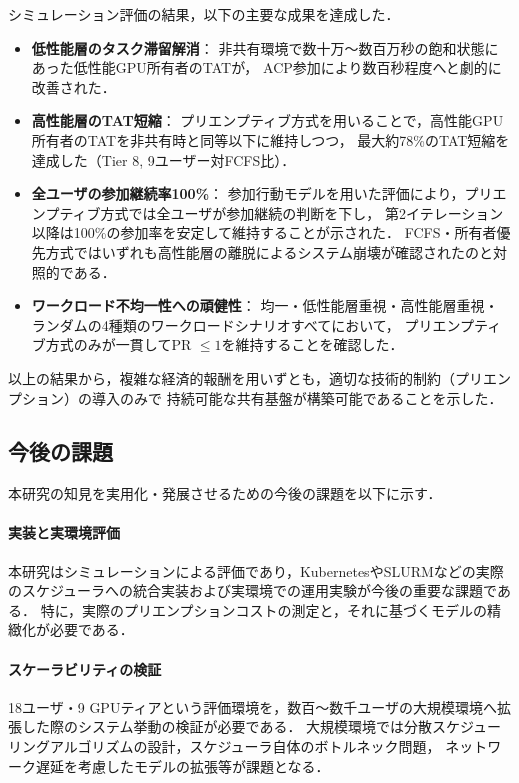 \documentclass[12pt,a4paper]{jsarticle}
\begin{document}
シミュレーション評価の結果，以下の主要な成果を達成した．

\begin{itemize}
  \item \textbf{低性能層のタスク滞留解消}：
    非共有環境で数十万〜数百万秒の飽和状態にあった低性能GPU所有者のTATが，
    ACP参加により数百秒程度へと劇的に改善された．

  \item \textbf{高性能層のTAT短縮}：
    プリエンプティブ方式を用いることで，高性能GPU所有者のTATを非共有時と同等以下に維持しつつ，
    最大約78\%のTAT短縮を達成した（Tier 8, 9ユーザー対FCFS比）．

  \item \textbf{全ユーザの参加継続率100\%}：
    参加行動モデルを用いた評価により，プリエンプティブ方式では全ユーザが参加継続の判断を下し，
    第2イテレーション以降は100\%の参加率を安定して維持することが示された．
    FCFS・所有者優先方式ではいずれも高性能層の離脱によるシステム崩壊が確認されたのと対照的である．

  \item \textbf{ワークロード不均一性への頑健性}：
    均一・低性能層重視・高性能層重視・ランダムの4種類のワークロードシナリオすべてにおいて，
    プリエンプティブ方式のみが一貫してPR $\leq 1$を維持することを確認した．
\end{itemize}

以上の結果から，複雑な経済的報酬を用いずとも，適切な技術的制約（プリエンプション）の導入のみで
持続可能な共有基盤が構築可能であることを示した．

\subsection{今後の課題}

本研究の知見を実用化・発展させるための今後の課題を以下に示す．

\paragraph{実装と実環境評価}
本研究はシミュレーションによる評価であり，KubernetesやSLURMなどの実際のスケジューラへの統合実装および実環境での運用実験が今後の重要な課題である．
特に，実際のプリエンプションコストの測定と，それに基づくモデルの精緻化が必要である．

\paragraph{スケーラビリティの検証}
18ユーザ・9 GPUティアという評価環境を，数百〜数千ユーザの大規模環境へ拡張した際のシステム挙動の検証が必要である．
大規模環境では分散スケジューリングアルゴリズムの設計，スケジューラ自体のボトルネック問題，
ネットワーク遅延を考慮したモデルの拡張等が課題となる．
\end{document}
